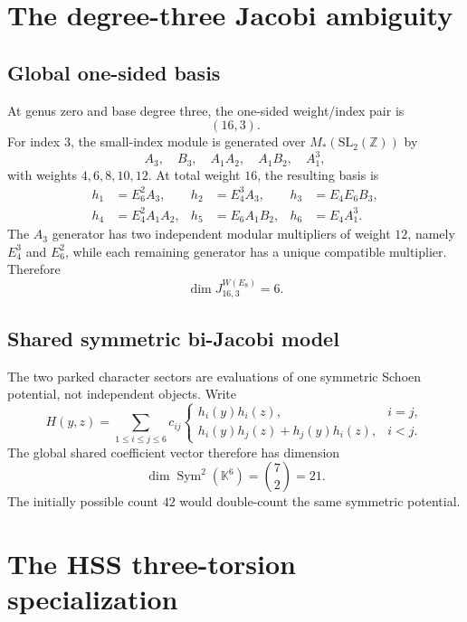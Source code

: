 \documentclass[11pt]{article}
\theoremstyle{definition}
\theoremstyle{remark}
\newcommand{\K}{\mathbb{K}}
\newcommand{\Sym}{\operatorname{Sym}}
\begin{document}
\section{The degree-three Jacobi ambiguity}

\subsection{Global one-sided basis}

At genus zero and base degree three, the one-sided weight/index pair is
\[
(16,3).
\]
For index $3$, the small-index module is generated over $M_*(\mathrm{SL}_2(\mathbb Z))$ by
\[
A_3,\quad B_3,\quad A_1A_2,\quad A_1B_2,\quad A_1^3,
\]
with weights $4,6,8,10,12$.  At total weight $16$, the resulting basis is
\begin{align}
 h_1&=E_6^2A_3, & h_2&=E_4^3A_3, & h_3&=E_4E_6B_3,\label{eq:h123}\\
 h_4&=E_4^2A_1A_2, & h_5&=E_6A_1B_2, & h_6&=E_4A_1^3.\label{eq:h456}
\end{align}
The $A_3$ generator has two independent modular multipliers of weight $12$, namely $E_4^3$ and $E_6^2$, while each remaining generator has a unique compatible multiplier.  Therefore
\begin{equation}\label{eq:globaldim6}
\dim J^{W(E_8)}_{16,3}=6.
\end{equation}

\subsection{Shared symmetric bi-Jacobi model}

The two parked character sectors are evaluations of one symmetric Schoen potential, not independent objects.  Write
\[
H(y,z)=\sum_{1\le i\le j\le6}c_{ij}
\begin{cases}
h_i(y)h_i(z),&i=j,\\
h_i(y)h_j(z)+h_j(y)h_i(z),&i<j.
\end{cases}
\]
The global shared coefficient vector therefore has dimension
\begin{equation}\label{eq:global21}
\dim\Sym^2(\K^6)=\binom{7}{2}=21.
\end{equation}
The initially possible count $42$ would double-count the same symmetric potential.

\section{The HSS three-torsion specialization}
\end{document}
